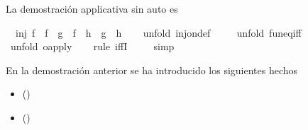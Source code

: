 \begin{isabellebody}
\begin{isamarkuptext}
  La demostración applicativa sin auto es%
\end{isamarkuptext}\isamarkuptrue%
\isamarkupfalse%
\isanewline
\ \ {\isachardoublequoteopen}inj\ f\ {\isasymLongrightarrow}\ {\isacharparenleft}f\ {\isasymcirc}\ g\ {\isacharequal}\ f\ {\isasymcirc}\ h{\isacharparenright}\ {\isacharequal}\ {\isacharparenleft}g\ {\isacharequal}\ h{\isacharparenright}{\isachardoublequoteclose}\isanewline
%
\isadelimproof
\ \ %
\endisadelimproof
%
\isatagproof
{}\isamarkupfalse%
\ {\isacharparenleft}unfold\ inj{\isacharunderscore}on{\isacharunderscore}def{\isacharparenright}\ \isanewline
\ \ \isamarkupfalse%
\ {\isacharparenleft}unfold\ fun{\isacharunderscore}eq{\isacharunderscore}iff{\isacharparenright}\ \isanewline
\ \ \isamarkupfalse%
\ {\isacharparenleft}unfold\ o{\isacharunderscore}apply{\isacharparenright}\isanewline
\ \ \isamarkupfalse%
\ {\isacharparenleft}rule\ iffI{\isacharparenright}\isanewline
\ \ \ \isamarkupfalse%
\ simp{\isacharplus}\isanewline
\ \ \isamarkupfalse%
%
\endisatagproof
{\isafoldproof}%
%
\isadelimproof
%
\endisadelimproof
%
\begin{isamarkuptext}%
En la demostración anterior se ha introducido los siguientes
  hechos
  \begin{itemize}
    \item {} \hfill ()
    \item {} \hfill ()
  \end{itemize} 


\end{isamarkuptext}
\end{isabellebody}
